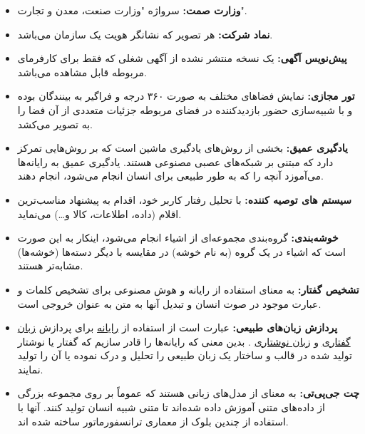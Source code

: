 \documentclass[12pt]{article}
\begin{document}
\begin{itemize}
		\item
		\textbf{وزارت صمت:}
		 سرواژه "وزارت صنعت، معدن و تجارت".
		\item
		\textbf{نماد شرکت:}
		 هر تصویر که نشانگر هویت یک سازمان می‌باشد.
		\item
		\textbf{پیش‌نویس آگهی:}
		یک نسخه منتشر نشده از آگهی شغلی که فقط برای کارفرمای مربوطه قابل مشاهده می‌باشد.
		\item
		\textbf{تور مجازی:‌}
		نمایش فضاهای مختلف به صورت ۳۶۰ درجه و فراگیر به بینندگان بوده و با شبیه‌سازی حضور بازدیدکننده در فضای مربوطه جزئیات متعددی از آن فضا را به تصویر می‌کشد.
		\item
		\textbf{یادگیری عمیق:}
		  بخشی از روش‌های یادگیری ماشین است که بر روش‌هایی تمرکز دارد که مبتنی بر شبکه‌های عصبی مصنوعی هستند. یادگیری عمیق به رایانه‌ها می‌آموزد آنچه را که به طور طبیعی برای انسان انجام می‌شود، انجام دهند.
		\item
		\textbf{سیستم های توصیه کننده:}
		  با تحلیل رفتار کاربر خود، اقدام به پیشنهاد مناسب‌ترین اقلام (داده، اطلاعات، کالا و…) می‌نماید.
		\item
		\textbf{خوشه‌بندی:}
		 گروه‌بندی مجموعه‌ای از اشیاء انجام می‌شود، اینکار به این صورت است که اشیاء در یک گروه (به نام خوشه) در مقایسه با دیگر دسته‌ها (خوشه‌ها) مشابه‌تر هستند.
		\item
		\textbf{تشخیص گفتار:}
		  به معنای استفاده از رایانه و هوش مصنوعی برای تشخیص کلمات و عبارت موجود در صوت انسان و تبدیل آنها به متن به عنوان خروجی است.
		\item
		\textbf{پردازش زبان‌های طبیعی:}
		 عبارت است از استفاده از
		 \href{https://fa.wikipedia.org/wiki/%D8%B1%D8%A7%DB%8C%D8%A7%D9%86%D9%87}{رایانه}
		  برای پردازش
		  \href{https://fa.wikipedia.org/wiki/%D8%B2%D8%A8%D8%A7%D9%86_%DA%AF%D9%81%D8%AA%D8%A7%D8%B1%DB%8C}{زبان گفتاری}
		  و
		  \href{https://fa.wikipedia.org/wiki/%D8%B2%D8%A8%D8%A7%D9%86_%D9%86%D9%88%D8%B4%D8%AA%D8%A7%D8%B1%DB%8C}{زبان نوشتاری}
		  . بدین معنی که رایانه‌ها را قادر سازیم که گفتار یا نوشتار تولید شده در قالب و ساختار یک زبان طبیعی را تحلیل و درک نموده یا آن را تولید نمایند.
		\item
		\textbf{چت جی‌پی‌تی:}
		 به معنای
		 از مدل‌های زبانی هستند که عموماً بر روی مجموعه بزرگی از داده‌های متنی آموزش داده شده‌اند تا متنی شبیه انسان تولید کنند. آنها با استفاده از چندین بلوک از معماری ترانسفورماتور ساخته شده اند.
	\end{itemize}
\end{document}

